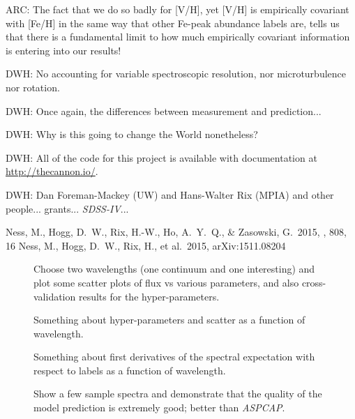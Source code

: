 \documentclass[12pt,preprint]{aastex}
\newcommand{\project}[1]{\textsl{#1}}
\newcommand{\acronym}[1]{{\small{#1}}}
\newcommand{\sdss}{\project{\acronym{SDSS-IV}}}
\newcommand{\aspcap}{\project{\acronym{ASPCAP}}}
\begin{document}
ARC: The fact that we do so badly for [V/H], yet [V/H] is empirically covariant with [Fe/H] in the same way that other Fe-peak abundance labels are, tells us that there is a fundamental limit to how much empirically covariant information is entering into our results!


DWH: No accounting for variable spectroscopic resolution, nor
microturbulence nor rotation.

DWH:  Once again, the differences between measurement and prediction...

DWH:  Why is this going to change the World nonetheless?

DWH: All of the code for this project is available with documentation
at \url{http://thecannon.io/}.

\acknowledgements
DWH: Dan Foreman-Mackey (UW) and Hans-Walter Rix (MPIA) and other people...
grants...
\sdss...

\begin{thebibliography}{dummy}\raggedright
{} Ness, M., Hogg, D.~W., 
Rix, H.-W., Ho, A.~Y.~Q., \& Zasowski, G.\ 2015, \apj, 808, 16
 Ness, M., Hogg, D.~W., 
Rix, H., et al.\ 2015, arXiv:1511.08204 
\end{thebibliography}

\clearpage

\begin{figure}[p]
\caption{Choose two wavelengths (one continuum and one interesting)
  and plot some scatter plots of flux vs various parameters, and also
  cross-validation results for the
  hyper-parameters.\label{fig:onewavelength}}
\end{figure}

\begin{figure}[p]
\caption{Something about hyper-parameters and scatter as a function of
  wavelength.\label{fig:hyperpars}}
\end{figure}

\begin{figure}[p]
\caption{Something about first derivatives of the spectral expectation
  with respect to labels as a function of
  wavelength.\label{fig:derivatives}}
\end{figure}

\begin{figure}[p]
\caption{Show a few sample spectra and demonstrate that the quality of
  the model prediction is extremely good; better than
  \aspcap.\label{fig:correctness}}
\end{figure}
\end{document}
